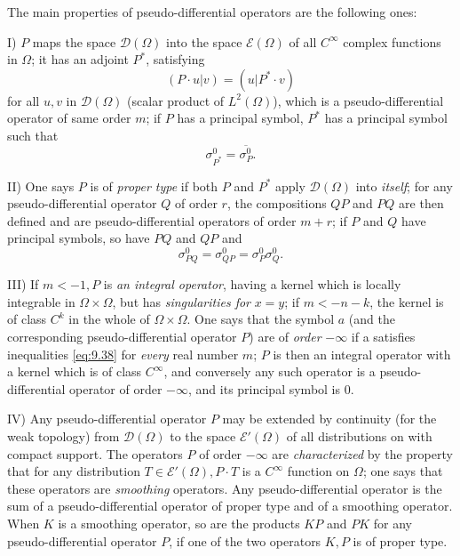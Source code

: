 \documentclass[12pt,a4paper,leqno,twoside]{extbook}
\begin{document}
The main properties of pseudo-differential operators are the following ones:

I) \(P\) maps the space \(\mathcal{D}(\Omega)\) into the space \(\mathcal{E}(\Omega)\) of all \(C^\infty\) complex functions in \(\Omega\); it has an adjoint \(P^*\), satisfying
\begin{equation}
    \label{eq:9.39}
    (P \cdot u | v) = (u |  P^* \cdot v)
\end{equation}
for all \(u, v\) in \(\mathcal{D}(\Omega)\) (scalar product of \(L^2(\Omega)\)), which is a pseudo-differential operator of same order \(m\); if \(P\) has a principal symbol, \(P^*\) has a principal symbol such that
\begin{equation}
    \label{eq:9.40}
    \sigma^0_{P^*} = \overline{\sigma^0_P}.
\end{equation}

II) One says \(P\) is of \emph{proper type} if both \(P\) and \(P^*\) apply \(\mathcal{D}(\Omega)\) into \emph{itself}; for any pseudo-differential operator \(Q\) of order \(r\), the compositions \(QP\) and \(PQ\) are then defined and are pseudo-differential operators of order \(m+r\); if \(P\) and \(Q\) have principal symbols, so have \(PQ\) and \(QP\) and
\begin{equation}
    \label{eq:9.41}
    \sigma^0_{PQ} = \sigma^0_{QP} = \sigma^0_P \sigma^0_Q.
\end{equation}

III) If \(m < -1, P\) is \emph{an integral operator}, having a kernel which is locally integrable in \(\Omega \times \Omega\), but has \emph{singularities for} \(x = y\); if \(m < -n-k\), the kernel is of class \(C^k\) in the whole of \(\Omega \times \Omega\). One says that the symbol \(a\) (and the corresponding pseudo-differential operator \(P\)) are of \emph{order} \(-\infty\) if a satisfies inequalities \eqref{eq:9.38} for \emph{every} real number \(m\); \(P\) is then an integral operator with a kernel which is of class \(C^\infty\), and conversely any such operator is a pseudo-differential operator of order \(-\infty\), and its principal symbol is 0.

IV) Any pseudo-differential operator \(P\) may be extended by continuity (for the weak topology) from \(\mathcal{D}(\Omega)\) to the space \(\mathcal{E}'(\Omega)\) of all distributions on with compact support. The operators \(P\) of order \(-\infty\) are \emph{characterized} by the property that for any distribution \(T \in \mathcal{E}'(\Omega), P \cdot T\) is a \(C^\infty\) function on \(\Omega\); one says that these operators are \emph{smoothing} operators. Any pseudo-differential operator is the sum of a pseudo-differential operator of proper type and of a smoothing operator. When \(K\) is a smoothing operator, so are the products \(KP\) and \(PK\) for any pseudo-differential operator \(P\), if one of the two operators \(K, P\) is of proper type.
\end{document}
